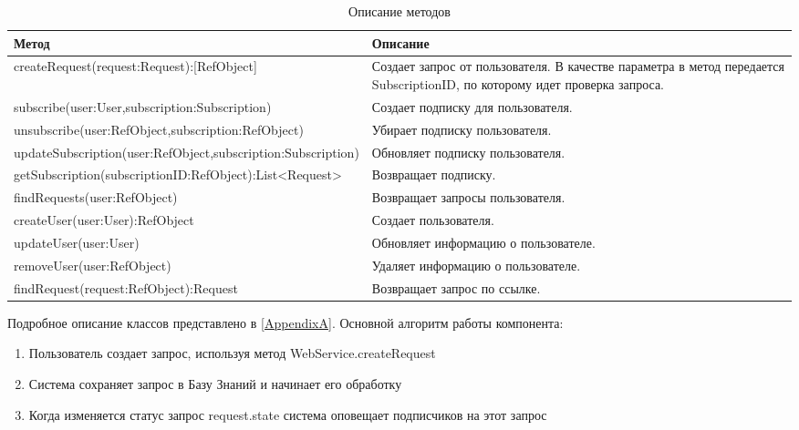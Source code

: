 \begin{table} [htbp]
   \centering
   \parbox{15cm}{\caption{Описание методов}\label{Methods Description}}
  \begin{tabular}{| p{12cm} ||p{5cm} |}
  \hline
  \hline
Метод & Описание \\
  \hline
  createRequest(request:Request):[RefObject] & Создает запрос от пользователя. В качестве параметра в метод передается SubscriptionID, по которому идет проверка запроса. \\
  
  \hline
  subscribe(user:User,subscription:Subscription)  & Создает подписку для пользователя. \\
  \hline
  unsubscribe(user:RefObject,subscription:RefObject)   & Убирает подписку пользователя. \\
  \hline
  updateSubscription(user:RefObject,subscription:Subscription)   & Обновляет подписку пользователя. \\
  \hline
  getSubscription(subscriptionID:RefObject):List<Request>    & Возвращает подписку. \\
  \hline
  findRequests(user:RefObject)     & Возвращает запросы пользователя. \\
  \hline
  createUser(user:User):RefObject     & Создает пользователя. \\
  \hline
  updateUser(user:User)     & Обновляет информацию о пользователе. \\ 
  \hline
  removeUser(user:RefObject)     & Удаляет информацию о пользователе. \\ 
  \hline
  findRequest(request:RefObject):Request     & Возвращает запрос по ссылке. \\ 
  
  \hline
  \hline
\end{tabular}
\end{table}
Подробное описание классов представлено в \ref{AppendixA}. Основной алгоритм работы компонента:
\begin{enumerate}
	\item Пользователь создает запрос, используя метод WebService.createRequest
	\item Система сохраняет запрос в Базу Знаний и начинает его обработку
	\item Когда изменяется статус запрос request.state система оповещает подписчиков на этот запрос
\end{enumerate}
\clearpage
